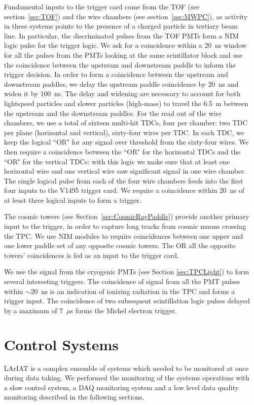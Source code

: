 Fundamental inputs to the trigger card come from the TOF (see section~\ref{sec:TOF}) and the wire chambers (see section~\ref{sec:MWPC}), as activity in these systems points to the presence of a charged particle in tertiary beam line.
In particular, the discriminated pulses from the TOF PMTs form a NIM logic pulse for the trigger logic. We ask for a coincidence within a 20~ns window for all the pulses from the PMTs looking at the same scintillator block and use the coincidence between the upstream and downstream paddle to inform the trigger decision. In order to form a coincidence between the upstream and downstream paddles, we delay the upstream paddle coincidence by 20~ns and widen it by 100~ns. The delay and widening are necessary to account for both  lightspeed particles and slower particles (high-mass) to travel the 6.5~m between the upstream and the downstream paddles. 
For the read out of the wire chambers, we use a total of sixteen multi-hit TDCs, four per chamber: two TDC per plane (horizontal and vertical), sixty-four wires per TDC. In each TDC, we keep the logical ``OR" for any signal over threshold from the sixty-four wires. We then require a coincidence between the ``OR" for the horizontal TDCs and the ``OR" for the vertical TDCs: with this logic we make sure that at least one horizontal wire and one vertical wire saw significant signal in one wire chamber.  The single logical pulse from each of the four wire chambers feeds into the first four inputs to the V1495 trigger card. We require a coincidence within 20~ns of at least three logical inputs to form a trigger.


The cosmic towers (see Section~\ref{sec:CosmicRayPaddle}) provide another primary input to the trigger, in order to capture long tracks from cosmic muons crossing the TPC. We use NIM modules to require coincidences between one upper and one lower paddle set of any opposite cosmic towers. The OR all the opposite towers' coincidences is fed as an input to the trigger card. 

We use the signal from the cryogenic PMTs (see Section \ref{sec:TPCLight}) to form several interesting triggers. The coincidence of signal from all the PMT pulses within $\sim$20~ns is an indication of ionizing radiation in the TPC and forms a trigger input.  The coincidence of two subsequent scintillation logic pulses delayed by a maximum of  7~$\mu$s forms the Michel electron trigger. 




\section{Control Systems}
LArIAT is a complex ensemble of systems which needed to be monitored at once during data taking.  We performed the monitoring of the systems operations with a slow control system, a DAQ monitoring system and a low level data quality monitoring described in the following sections.

